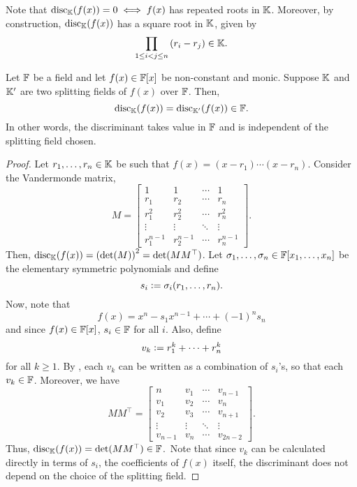 \begin{rem} \label{rem:disc=0-iff-repeated}
    Note that $\operatorname{disc}_{\mathbb{K}}(f(x)) = 0 \iff f(x)$ has repeated roots in $\mathbb{K}$. Moreover, by construction, $\operatorname{disc}_{\mathbb{K}}(f(x))$ has a square root in $\mathbb{K}$, given by
    \[
        \prod_{1 \leq i < j \leq n} \, (r_i - r_j) \in \mathbb{K}.
    \]
\end{rem}

\begin{prop} \label{prop:disc-independent-of-SF}
    Let $\mathbb{F}$ be a field and let $f(x) \in \mathbb{F}[x]$ be non-constant and monic. Suppose $\mathbb{K}$ and $\mathbb{K}^{\prime}$ are two splitting fields of $f(x)$ over $\mathbb{F}$. Then, 
    \[
        \operatorname{disc}_{\mathbb{K}}(f(x)) = \operatorname{disc}_{\mathbb{K}^{\prime}}(f(x)) \in \mathbb{F}.
    \]
    In other words, the discriminant takes value in $\mathbb{F}$ and is independent of the splitting field chosen.
\end{prop}
\begin{proof}
    Let $r_1, \ldots, r_n \in \mathbb{K}$ be such that $f(x) = (x-r_1)\cdots(x-r_n)$. Consider the Vandermonde matrix, 
    \[
        M = \begin{bmatrix}
            1 & 1 & \cdots & 1 \\
            r_1 & r_2 & \cdots & r_n \\
            r_1^2 & r_2^2 & \cdots & r_n^2 \\
            \vdots & \vdots & \ddots & \vdots \\
            r_1^{n-1} & r_2^{n-1} & \cdots & r_n^{n-1}
        \end{bmatrix}.
    \]
    Then, $\operatorname{disc}_{\mathbb{K}}(f(x)) = \left( \det(M) \right)^2 = \det(MM^{\top})$. Let $\sigma_1, \ldots, \sigma_n \in \mathbb{F}[x_1, \ldots, x_n]$ be the elementary symmetric polynomials and define
    \[
        s_i \vcentcolon= \sigma_i(r_1, \ldots, r_n).
    \]
    Now, note that
    \[
        f(x) = x^n - s_1x^{n-1} + \cdots + (-1)^n s_n
    \]
    and since $f(x) \in \mathbb{F}[x]$, $s_i \in \mathbb{F}$ for all $i$. Also, define
    \[
        v_k \vcentcolon= r_1^k + \cdots + r_n^k
    \]
    for all $k \geq 1$. By , each $v_k$ can be written as a combination of $s_i$'s, so that each $v_k \in \mathbb{F}$. Moreover, we have
    \[
        MM^{\top} = \begin{bmatrix}
            n & v_1 & \cdots & v_{n-1} \\
            v_1 & v_2 & \cdots & v_n \\
            v_2 & v_3 & \cdots & v_{n+1} \\
            \vdots & \vdots & \ddots & \vdots \\
            v_{n-1} & v_n & \cdots & v_{2n-2}
        \end{bmatrix}.
    \]
    Thus, $\operatorname{disc}_{\mathbb{K}}(f(x)) = \det(MM^{\top}) \in \mathbb{F}$.\footnotemark\ Note that since $v_k$ can be calculated directly in terms of $s_i$, the coefficients of $f(x)$ itself, the discriminant does not depend on the choice of the splitting field.
\end{proof}

